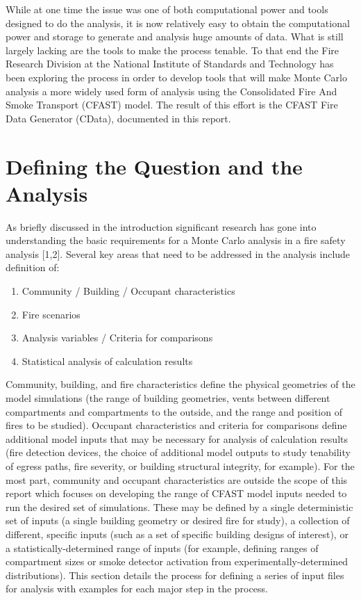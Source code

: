 \documentclass[12pt,twoside]{book}
\begin{document}
While at one time the issue was one of both computational power and tools designed to do the analysis, it is now relatively easy to obtain the computational power and storage to generate and analysis huge amounts of data. What is still largely lacking are the tools to make the process tenable. To that end the Fire Research Division at the National Institute of Standards and Technology has been exploring the process \cite{NIST_TN_2041,Reneke_2017,Reneke_2018,Cleary_2019} in order to develop tools that will make Monte Carlo analysis a more widely used form of analysis using the Consolidated Fire And Smoke Transport (CFAST) model. The result of this effort is the CFAST Fire Data Generator (CData), documented in this report.

%
%

\chapter{Defining the Question and the Analysis}

As briefly discussed in the introduction significant research has gone into understanding the basic requirements for a Monte Carlo analysis in a fire safety analysis [1,2]. Several key areas that need to be addressed in the analysis include definition of:

\begin{enumerate}
  \item Community / Building / Occupant characteristics
  \item Fire scenarios
  \item Analysis variables / Criteria for comparisons
  \item Statistical analysis of calculation results
\end{enumerate}

Community, building, and fire characteristics define the physical geometries of the model simulations (the range of building geometries, vents between different compartments and compartments to the outside, and the range and position of fires to be studied). Occupant characteristics and criteria for comparisons define additional model inputs that may be necessary for analysis of calculation results (fire detection devices, the choice of additional model outputs to study tenability of egress paths, fire severity, or building structural integrity, for example). For the most part, community and occupant characteristics are outside the scope of this report which focuses on developing the range of CFAST model inputs needed to run the desired set of simulations. These may be defined by a single deterministic set of inputs (a single building geometry or desired fire for study), a collection of different, specific inputs (such as a set of specific building designs of interest), or a statistically-determined range of inputs (for example, defining ranges of compartment sizes or smoke detector activation from experimentally-determined distributions). This section details the process for defining a series of input files for analysis with examples for each major step in the process.
\end{document}

